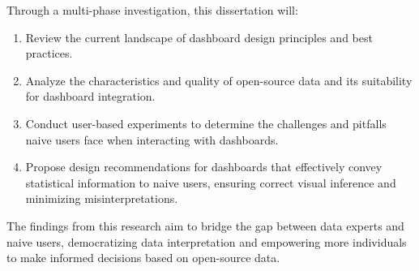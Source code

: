 \documentclass[print]{nuthesis}
\begin{document}
Through a multi-phase investigation, this dissertation will:

\begin{enumerate}
\def\labelenumi{\arabic{enumi}.}
\item
  Review the current landscape of dashboard design principles and best practices.
\item
  Analyze the characteristics and quality of open-source data and its suitability for dashboard integration.
\item
  Conduct user-based experiments to determine the challenges and pitfalls naive users face when interacting with dashboards.
\item
  Propose design recommendations for dashboards that effectively convey statistical information to naive users, ensuring correct visual inference and minimizing misinterpretations.
\end{enumerate}

The findings from this research aim to bridge the gap between data experts and naive users, democratizing data interpretation and empowering more individuals to make informed decisions based on open-source data.
\end{document}

